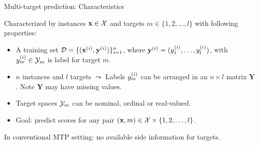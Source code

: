 \documentclass[11pt,compress,t,notes=noshow, xcolor=table]{beamer}
\begin{document}
\begin{frame}{Multi-target prediction: Characteristics}

    Characterized by instances $\mathbf{x} \in \mathcal{X}$ and targets $m \in \{1, 2, \ldots, l\}$ with following properties: 

    \begin{itemize} \small


        \item A training set $\mathcal{D} = \{(\mathbf{x}^{(i)}, \mathbf{y}^{(i)})\}_{i=1}^n$, where $\mathbf{y}^{(i)} = (y^{(i)}_1, \dots, y^{(i)}_l)$, with $y^{(i)}_m \in \mathcal{Y}_m$ is label for target $m$.  
      
        \item $n$ instances and $l$ targets $\leadsto$ Labels $y^{(i)}_m$ can be arranged in an $n \times l$ matrix $\bm{Y}$. Note $\bm{Y}$ may have missing values.

        \item Target spaces $\mathcal{Y}_m$ can be nominal, ordinal or real-valued.  
    
        \item Goal: predict scores for any pair $(\mathbf{x}, m) \in \mathcal{X} \times \{1, 2, \ldots, l\}$.  
    
    \end{itemize}
In conventional MTP setting: no available side information for targets. 
\end{frame}

\end{document}
